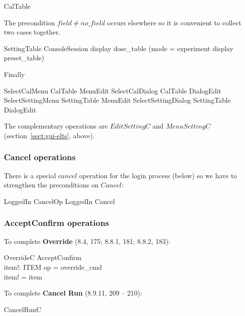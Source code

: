 \documentclass{article}
\begin{document}
\begin{zed}
CalTable 
\end{zed}
The precondition $field \neq no\_field$ occurs elsewhere so it is
convenient to collect two cases together.

\begin{schema}{SettingTable}
	ConsoleSession
\where
	display \in dose\_table \lor (mode = experiment \land display \in preset\_table)
\end{schema}
Finally 

\begin{zed}
	SelectCalMenu  CalTable \land MenuEdit
\also
	SelectCalDialog  CalTable \land DialogEdit
\also
	SelectSettingMenu  SettingTable \land MenuEdit
\also
	SelectSettingDialog  SettingTable \land DialogEdit
\end{zed}
The complementary operations are $EditSettingC$ and $MenuSettingC$
(section~\ref{sect:gui-elts}, above).

\subsubsection{Cancel operations}

There is a special $cancel$ operation for the login process (below) so
we have to strengthen the preconditions on $Cancel$:

\begin{zed} 
	LoggedIn 
\also
	CancelOp  LoggedIn \land Cancel
\end{zed}

\subsubsection{AcceptConfirm operations}

To complete {\bf Override} (8.4, 175; 8.8.1, 181; 8.8.2, 183):

\begin{schema}{OverrideC}
	AcceptConfirm \\
	item!: ITEM
\where
	op = override\_cmd \\
	item! = item
\end{schema}
To complete {\bf Cancel Run} (8.9.11, 209 -- 210):

\begin{zed} 
	CancelRunC 
\end{zed}
\end{document}
